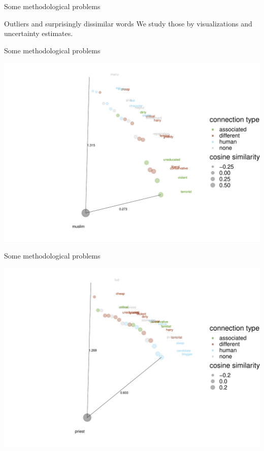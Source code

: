 \documentclass[
  10pt,
  ignorenonframetext,
  x11names, dvipsnames, bibspacing,natbib, table]{beamer}
\begin{document}
\begin{frame}{Some methodological problems}
\protect\hypertarget{some-methodological-problems-3}{}
\begin{block}{Outliers and surprisingly dissimilar words}
\protect\hypertarget{outliers-and-surprisingly-dissimilar-words}{}
We study those by visualizations and uncertainty estimates.
\end{block}
\end{frame}

\begin{frame}{Some methodological problems}
\protect\hypertarget{some-methodological-problems-4}{}
\begin{center}\includegraphics[width=1\linewidth]{presentationBoston_files/figure-beamer/unnamed-chunk-4-1} \end{center}
\end{frame}

\begin{frame}{Some methodological problems}
\protect\hypertarget{some-methodological-problems-5}{}
\begin{center}\includegraphics[width=1\linewidth]{presentationBoston_files/figure-beamer/unnamed-chunk-5-1} \end{center}
\end{frame}
\end{document}
